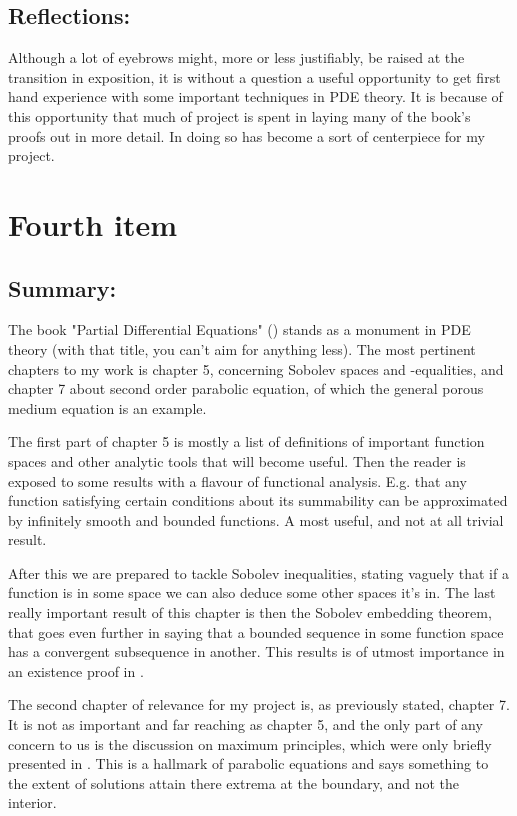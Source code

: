 \documentclass[11pt, a4paper]{article}
\begin{document}
\subsection{Reflections:}
Although a lot of eyebrows might, more or less justifiably, be raised at the transition in exposition, it is without a question a useful opportunity to get first hand experience with some important techniques in PDE theory. It is because of this opportunity that much of project is spent in laying many of the book's proofs out in more detail. In doing so \cite{vazquez2007porous} has become a sort of centerpiece for my project.

\section{Fourth item}
\subsection{Summary:}
The book "Partial Differential Equations" (\cite{evans}) stands as a monument in PDE theory (with that title, you can't aim for anything less). The most pertinent chapters to my work is chapter 5, concerning Sobolev spaces and -equalities, and chapter 7 about second  order parabolic equation, of which the general porous medium equation is an example.

The first part of chapter 5 is mostly a list of definitions of important function spaces and other analytic tools that will become useful. Then the reader is exposed to some results with a flavour of functional analysis. E.g. that any function satisfying certain conditions about its summability can be approximated by infinitely smooth and bounded functions. A most useful, and not at all trivial result.

After this we are prepared to tackle Sobolev inequalities, stating vaguely that if a function is in some space we can also deduce some other spaces it's in. The last really important result of this chapter is then the Sobolev embedding theorem, that goes even further in saying that a bounded sequence in some function space has a convergent subsequence in another. This results is of utmost importance in an existence proof in \cite{vazquez2007porous}.

The second chapter of relevance for my project is, as previously stated, chapter 7. It is not as important and far reaching as chapter 5, and the only part of any concern to us is the discussion on maximum principles, which were only briefly presented in \cite{vazquez2007porous}. This is a hallmark of parabolic equations and says something to the extent of solutions attain there extrema at the boundary, and not the interior.
\end{document}
